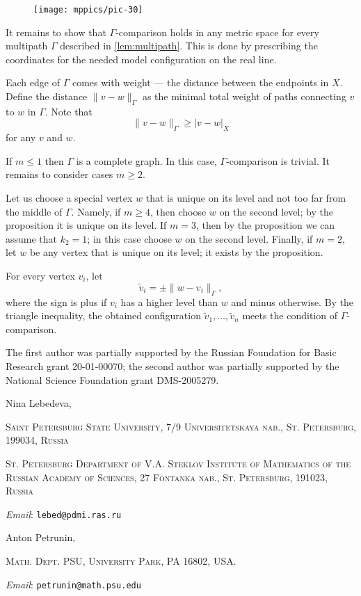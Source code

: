 \documentclass{article}
\makeatletter
\newcommand{\Addresses}{{\bigskip\footnotesize

\noindent Nina Lebedeva,
\par\nopagebreak
 \textsc{Saint Petersburg State University, 7/9 Universitetskaya nab., St. Petersburg, 199034, Russia}
\par
\nopagebreak
 \textsc{St. Petersburg Department of V.A. Steklov Institute of Mathematics of the Russian Academy of Sciences, 27 Fontanka nab., St. Petersburg, 191023, Russia}
  \par\nopagebreak
  \textit{Email}: \texttt{lebed@pdmi.ras.ru}

\medskip

\noindent   Anton Petrunin, 
\par\nopagebreak
 \textsc{Math. Dept. PSU, University Park, PA 16802, USA.}
  \par\nopagebreak
  \textit{Email}: \texttt{petrunin@math.psu.edu}
  
}}
\makeatother
\begin{document}
\begin{figure}[h!]
\centering
\texttt{[image: mppics/pic-30]}
\end{figure}
\qedsf


It remains to show that $\Gamma$-comparison holds in any metric space for every multipath $\Gamma$ described in \ref{lem:multipath}.
This is done by prescribing the coordinates for the needed model configuration on the real line.

Each edge of $\Gamma$ comes with weight --- the distance between the endpoints in $X$.
Define the distance $\|v-w\|_\Gamma$ as the minimal total weight of paths connecting $v$ to $w$ in $\Gamma$.
Note that 
\[\|v-w\|_\Gamma\ge |v-w|_X\]
for any $v$ and $w$.

If $m\le 1$ then $\Gamma$ is a complete graph.
In this case, $\Gamma$-comparison is trivial.
It remains to consider cases $m\ge2$.

Let us choose a special vertex $w$ that is unique on its level and not too far from the middle of $\Gamma$.
Namely, if $m\ge 4$, then choose $w$ on the second level; by the proposition it is unique on its level.
If $m=3$, then by the proposition we can assume that $k_2=1$; in this case choose $w$ on the second level.
Finally, if $m=2$, let $w$ be any vertex that is unique on its level; it exists by the proposition. 

For every vertex $v_i$, let
\[\tilde v_i=\pm \|w-v_i\|_\Gamma,\]
where the sign is plus if $v_i$ has a higher level than $w$ and minus otherwise.
By the triangle inequality, the obtained configuration $\tilde v_1,\dots,\tilde v_n$ meets the condition of $\Gamma$-comparison.
\qeds


The first author was partially supported by the Russian Foundation for Basic Research grant 20-01-00070; the second author was partially supported by the National Science Foundation grant DMS-2005279.

{\sloppy
\printbibliography[heading=bibintoc]
\fussy
}

\Addresses
\end{document}
